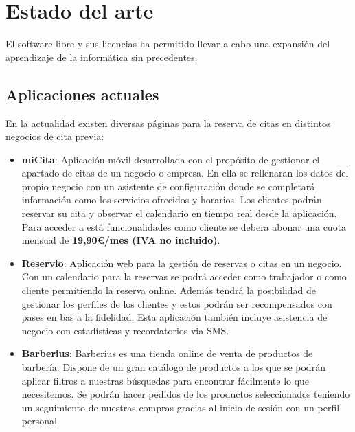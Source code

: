 \chapter{Estado del arte}

El software libre y sus licencias \cite{gplv3} ha permitido llevar a cabo una expansión del
aprendizaje de la informática sin precedentes.

\section{Aplicaciones actuales}

En la actualidad existen diversas páginas para la reserva de citas en distintos negocios de cita previa:

\vspace{-0.5em}
\begin{itemize}
    \item \textbf{miCita}: Aplicación móvil desarrollada con el propósito de gestionar el apartado de citas de un
    negocio o empresa. En ella se rellenaran los datos del propio negocio con un asistente de configuración donde
    se completará información como los servicios ofrecidos y horarios. Los clientes podrán reservar su cita y
    observar el calendario en tiempo real desde la aplicación. Para acceder a está funcionalidades como cliente
    se debera abonar una cuota mensual de \textbf{19,90\euro/mes (IVA no incluido)}.\cite{micita}

    \item \textbf{Reservio}: Aplicación web para la gestión de reservas o citas en un negocio.
    Con un calendario para la reservas se podrá acceder como trabajador o como cliente permitiendo la reserva online.
    Además tendrá la posibilidad de gestionar los perfiles de los clientes  y estos podrán ser recompensados
    con pases en bas a la fidelidad. Esta aplicación también incluye asistencia de negocio con estadísticas y
    recordatorios via SMS.\cite{reservio}

    \item \textbf{Barberius}: Barberius es una tienda online de venta de productos de barbería.
    Dispone de un gran catálogo de productos a los que se podrán aplicar filtros a nuestras búsquedas
    para encontrar fácilmente lo que necesitemos. Se podrán hacer pedidos de los productos seleccionados
    teniendo un seguimiento de nuestras compras gracias al inicio de sesión con un perfil personal.\cite{barberius}
\end{itemize}

